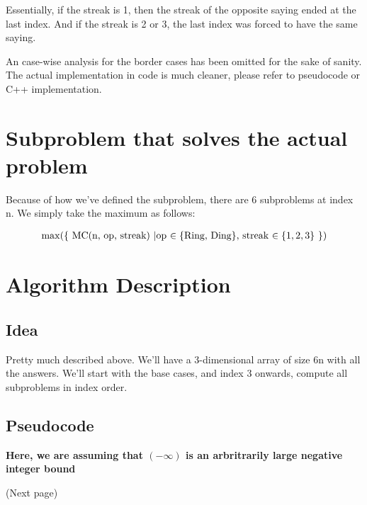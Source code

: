 \documentclass{article}
\begin{document}
Essentially, if the streak is 1, then the streak of the opposite saying ended at the last index. And if the streak is 2 or 3, the last index was forced to have the same saying. 

An case-wise analysis for the border cases has been omitted for the sake of sanity. The actual implementation in code is much cleaner, please refer to pseudocode or C++ implementation.

\section{Subproblem that solves the actual problem}

Because of how we've defined the subproblem, there are 6 subproblems at index n. We simply take the maximum as follows:

\begin{align*}
    \max(\{\text{ MC(n, op, streak) \textbar op $\in \{\text{Ring, Ding}\}$, streak $\in \{1,2,3\}$ }\})
\end{align*}

\section{Algorithm Description}

\subsection{Idea}
Pretty much described above. We'll have a 3-dimensional array of size 6n with all the answers. We'll start with the base cases, and index 3 onwards, compute all subproblems in index order.

\subsection{Pseudocode}

\textbf{Here, we are assuming that $(-\infty)$ is an arbritrarily large negative integer bound}

(Next page)
\end{document}

